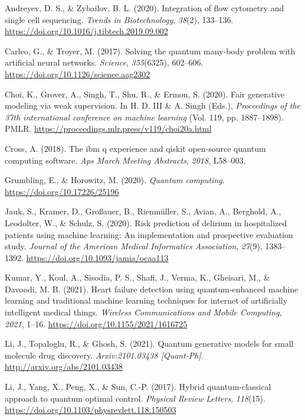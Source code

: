 \documentclass{scrartcl}
\begin{document}
\begin{hangparas}{1.5em}{1}
\hypertarget{citeproc_bib_item_1}{Andreyev, D. S., \& Zybailov, B. L. (2020). Integration of flow cytometry and single cell sequencing. \textit{Trends in Biotechnology}, \textit{38}(2), 133–136. \url{https://doi.org/10.1016/j.tibtech.2019.09.002}}

\hypertarget{citeproc_bib_item_2}{Carleo, G., \& Troyer, M. (2017). Solving the quantum many-body problem with artificial neural networks. \textit{Science}, \textit{355}(6325), 602–606. \url{https://doi.org/10.1126/science.aag2302}}

\hypertarget{citeproc_bib_item_3}{Choi, K., Grover, A., Singh, T., Shu, R., \& Ermon, S. (2020). Fair generative modeling via weak supervision. In H. D. III \& A. Singh (Eds.), \textit{Proceedings of the 37th international conference on machine learning} (Vol. 119, pp. 1887–1898). PMLR. \url{https://proceedings.mlr.press/v119/choi20a.html}}

\hypertarget{citeproc_bib_item_4}{Cross, A. (2018). The ibm q experience and qiskit open-source quantum computing software. \textit{Aps March Meeting Abstracts}, \textit{2018}, L58–003.}

\hypertarget{citeproc_bib_item_5}{Grumbling, E., \& Horowitz, M. (2020). \textit{Quantum computing}. \url{https://doi.org/10.17226/25196}}

\hypertarget{citeproc_bib_item_6}{Jauk, S., Kramer, D., Großauer, B., Rienmüller, S., Avian, A., Berghold, A., Leodolter, W., \& Schulz, S. (2020). Risk prediction of delirium in hospitalized patients using machine learning: An implementation and prospective evaluation study. \textit{Journal of the American Medical Informatics Association}, \textit{27}(9), 1383–1392. \url{https://doi.org/10.1093/jamia/ocaa113}}

\hypertarget{citeproc_bib_item_7}{Kumar, Y., Koul, A., Sisodia, P. S., Shafi, J., Verma, K., Gheisari, M., \& Davoodi, M. B. (2021). Heart failure detection using quantum-enhanced machine learning and traditional machine learning techniques for internet of artificially intelligent medical things. \textit{Wireless Communications and Mobile Computing}, \textit{2021}, 1–16. \url{https://doi.org/10.1155/2021/1616725}}

\hypertarget{citeproc_bib_item_8}{Li, J., Topaloglu, R., \& Ghosh, S. (2021). Quantum generative models for small molecule drug discovery. \textit{Arxiv:2101.03438 [Quant-Ph]}. \url{http://arxiv.org/abs/2101.03438}}

\hypertarget{citeproc_bib_item_9}{Li, J., Yang, X., Peng, X., \& Sun, C.-P. (2017). Hybrid quantum-classical approach to quantum optimal control. \textit{Physical Review Letters}, \textit{118}(15). \url{https://doi.org/10.1103/physrevlett.118.150503}}


\end{hangparas}
\end{document}
